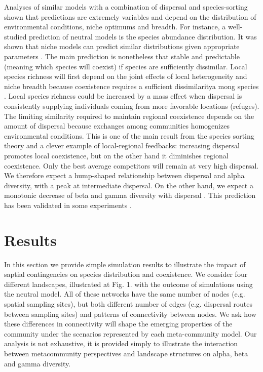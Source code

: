 \documentclass[12pt]{article}
\begin{document}
Analyses of similar models with a combination of dispersal and species-sorting
shown that predictions are extremely variables and depend on the distribution of
environmental conditions, niche optimums and breadth. For instance, a
well-studied prediction of neutral models is the species abundance distribution.
It was shown that niche models can predict similar distributions given appropriate parameters
\parencite{Tilman2004,Gravel2006}. The main prediction is nonetheless that
stable and predictable (meaning which species will coexist) if species are
sufficiently dissimilar. Local species richness will first depend on the joint
effects of local heterogeneity and niche breadth because coexistence requires a
sufficient dissimilaritya mong species \parencite{Schwilk2005}. Local species richness could be
increased by a mass effect when dispersal is consistently supplying individuals
coming from more favorable locations (refuges). The limiting similarity required
to maintain regional coexistence depends on the amount of dispersal because
exchanges among communities homogenizes environmental conditions. This is one of
the main result from the species sorting theory and a clever example of
local-regional feedbacks: increasing dispersal promotes local coexistence, but
on the other hand it diminishes regional coexistence. Only the best average
competitors will remain at very high dispersal.  We therefore expect a
hump-shaped relationship between dispersal and alpha diversity, with a peak at
intermediate dispersal. On the other hand, we expect a monotonic decrease of
beta and gamma diversity with dispersal \parencite{Mouquet2003}. This prediction
has been validated in some experiments \parencite{Venail2008, Logue2011}.

\section{Results}

In this section we provide simple simulation results to illustrate the impact of
saptial contingencies on species distribution and coexistence. We consider four
different landscapes, illustrated at Fig. 1. with the outcome of simulations
using the neutral model. All of these networks have the same number of nodes
(e.g. spatial sampling sites), but both different number of edges (e.g.
dispersal routes between sampling sites) and patterns of connectivity between
nodes. We ask how these differences in connectivity will shape the emerging
properties of the community under the scenarios represented by each
meta-community model. Our analysis is not exhaustive, it is provided simply to
illustrate the interaction between metacommunity perspectives and landscape
structures on alpha, beta and gamma diversity.
\end{document}
